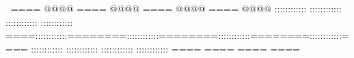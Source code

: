 ====    @@@@        ====    @@@@        ====    @@@@        ====    @@@@            ::::::::::::        ::::::::::::        ::::::::::::        ::::::::::::    ====::::::::::::========::::::::::::========::::::::::::========::::::::::::====    ::::::::::::        ::::::::::::        ::::::::::::        ::::::::::::                    ====                ====                ====                ====